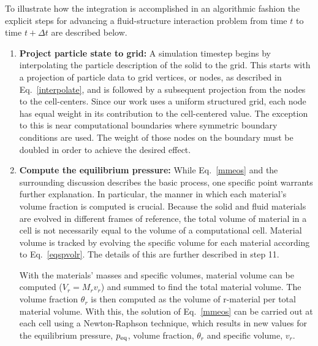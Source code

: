 To illustrate how the integration is accomplished in an algorithmic fashion 
the explicit steps for advancing a fluid-structure interaction problem from 
time $t$ to time $t+\Delta{t}$ are described below.
\begin{enumerate}


\item {\bf Project particle state to grid:} A simulation timestep begins by
interpolating the particle description of the solid to the grid.  This starts
with a projection of particle data to grid vertices, or nodes, as described
in Eq.~\ref{interpolate}, and is followed by a subsequent projection from
the nodes to the cell-centers.  Since our work uses a uniform structured
grid, each node has equal weight in its contribution to the cell-centered
value.  The exception to this is near computational boundaries where
symmetric boundary conditions are used.  The weight of those nodes on
the boundary must be doubled in order to achieve the desired effect.

\item {\bf Compute the equilibrium pressure:} While Eq.~\ref{mmeos} and the
surrounding discussion describes the basic process, one specific point warrants
further explanation.  In particular, the manner in which each material's
volume fraction is computed is crucial.  Because the solid and fluid materials 
are evolved in different frames of reference, the total volume of material in a 
cell is not necessarily equal to the volume of a computational cell.  Material 
volume is tracked by evolving the specific volume for each material 
according to Eq.~\ref{eqspvolr}.
The details of this are further described in step 11.

With the materials' masses and specific volumes, material volume
can be computed ($V_r=M_r v_r$) and summed to find the total material volume.  The volume
fraction $\theta_r$ is then computed as the volume of r-material per total
material volume.  With this, the solution of Eq.~\ref{mmeos} can be carried
out at each cell using a Newton-Raphson technique\cite{Harlow1975},
which results in new values for the equilibrium pressure, $p_{\text{eq}}$,
volume fraction, $\theta_r$ and specific volume, $v_r$.


\end{enumerate}
